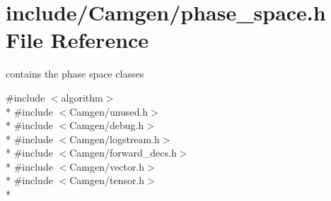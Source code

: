 \hypertarget{a00694}{\section{include/\-Camgen/phase\-\_\-space.h File Reference}
\label{a00694}
}


contains the phase space classes  


{\ttfamily \#include $<$algorithm$>$}\\*
{\ttfamily \#include $<$Camgen/unused.\-h$>$}\\*
{\ttfamily \#include $<$Camgen/debug.\-h$>$}\\*
{\ttfamily \#include $<$Camgen/logstream.\-h$>$}\\*
{\ttfamily \#include $<$Camgen/forward\-\_\-decs.\-h$>$}\\*
{\ttfamily \#include $<$Camgen/vector.\-h$>$}\\*
{\ttfamily \#include $<$Camgen/tensor.\-h$>$}\\*
